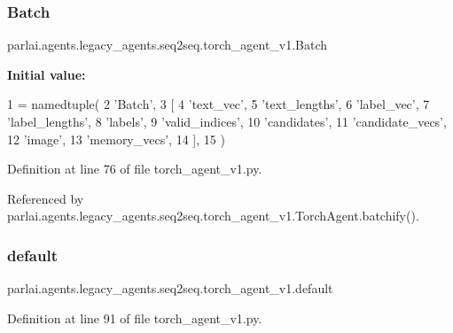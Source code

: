 \subsubsection{\texorpdfstring{Batch}{Batch}}
{\footnotesize\ttfamily parlai.\+agents.\+legacy\+\_\+agents.\+seq2seq.\+torch\+\_\+agent\+\_\+v1.\+Batch}

{\bfseries Initial value\+:}
\begin{DoxyCode}
1 =  namedtuple(
2     \textcolor{stringliteral}{'Batch'},
3     [
4         \textcolor{stringliteral}{'text\_vec'},
5         \textcolor{stringliteral}{'text\_lengths'},
6         \textcolor{stringliteral}{'label\_vec'},
7         \textcolor{stringliteral}{'label\_lengths'},
8         \textcolor{stringliteral}{'labels'},
9         \textcolor{stringliteral}{'valid\_indices'},
10         \textcolor{stringliteral}{'candidates'},
11         \textcolor{stringliteral}{'candidate\_vecs'},
12         \textcolor{stringliteral}{'image'},
13         \textcolor{stringliteral}{'memory\_vecs'},
14     ],
15 )
\end{DoxyCode}


Definition at line 76 of file torch\+\_\+agent\+\_\+v1.\+py.



Referenced by parlai.\+agents.\+legacy\+\_\+agents.\+seq2seq.\+torch\+\_\+agent\+\_\+v1.\+Torch\+Agent.\+batchify().

\mbox{\label{namespaceparlai_1_1agents_1_1legacy__agents_1_1seq2seq_1_1torch__agent__v1_a5d17ee55b86a7e7ee0de4dca59bf3bdc}} 
\subsubsection{\texorpdfstring{default}{default}}
{\footnotesize\ttfamily parlai.\+agents.\+legacy\+\_\+agents.\+seq2seq.\+torch\+\_\+agent\+\_\+v1.\+default}



Definition at line 91 of file torch\+\_\+agent\+\_\+v1.\+py.

\mbox{\label{namespaceparlai_1_1agents_1_1legacy__agents_1_1seq2seq_1_1torch__agent__v1_a2689006ea97d09413fb242f984bd8016}} 
